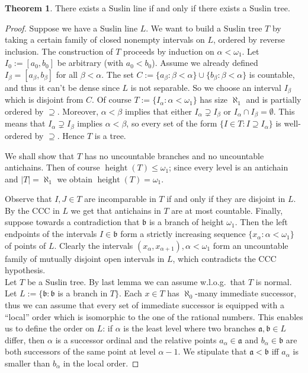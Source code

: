 \documentclass[12pt,a4paper]{report}
\theoremstyle{definition}
\newtheorem{theorem}{Theorem}[chapter] %
\theoremstyle{num.custom-title}
\DeclareMathOperator{\height}{height}
\begin{document}
\begin{theorem}
There exists a Suslin line if and only if there exists a Suslin tree.
\begin{proof}
Suppose we have a Suslin line $L$. We want to build a Suslin tree $T$ by taking a certain family of closed nonempty intervals on $L$, ordered by reverse inclusion. The construction of $T$ proceeds by induction on $\alpha < \omega_1$. Let $I_0 := [a_0,b_0]$ be arbitrary (with $a_0 < b_0$). Assume we already defined $I_\beta = [a_\beta,b_\beta]$ for all $\beta < \alpha$. The set $C := \{a_\beta : \beta < \alpha\} \cup \{b_\beta : \beta < \alpha\}$ is countable, and thus it can't be dense since $L$ is not separable. So we choose an interval $I_\beta$ which is disjoint from $C$. Of course $T := \{I_\alpha : \alpha < \omega_1\}$ has size $\aleph_1$ and is partially ordered by $\supseteq$. Moreover, $\alpha < \beta$ implies that either $I_\alpha \supsetneq I_\beta$ or $I_\alpha \cap I_\beta = \emptyset$. This means that $I_\alpha \supsetneq I_\beta$ implies $\alpha < \beta$, so every set of the form $\{I \in T : I \supseteq I_\alpha\}$ is well-ordered by $\supseteq$. Hence $T$ is a tree.

We shall show that $T$ has no uncountable branches and no uncountable antichains. Then of course $\height(T) \leq \omega_1$; since every level is an antichain and $|T| = \aleph_1$ we obtain $\height(T) = \omega_1$.

Observe that $I,J \in T$ are incomparable in $T$ if and only if they are disjoint in $L$. By the CCC in $L$ we get that antichains in $T$ are at most countable. Finally, suppose towards a contradiction that $\mathfrak{b}$ is a branch of height $\omega_1$. Then the left endpoints of the intervals $I \in \mathfrak{b}$ form a strictly increasing sequence $\{x_\alpha : \alpha < \omega_1\}$ of points of $L$. Clearly the intervals $(x_\alpha, x_{\alpha+1}), \alpha < \omega_1$ form an uncountable family of mutually disjoint open intervals in $L$, which contradicts the CCC hypothesis.\\[6pt]
%
\indent Let $T$ be a Suslin tree. By last lemma we can assume w.l.o.g.\ that $T$ is normal. Let $L := \{\mathfrak{b} : \mathfrak{b}$ is a branch in $T\}$. Each $x \in T$ has $\aleph_0$-many immediate successor, thus we can assume that every set of immediate successor is equipped with a ``local'' order which is isomorphic to the one of the rational numbers. This enables us to define the order on $L$: if $\alpha$ is the least level where two branches $\mathfrak{a}, \mathfrak{b} \in L$ differ, then $\alpha$ is a successor ordinal and the relative points $a_\alpha \in \mathfrak{a}$ and $b_\alpha \in \mathfrak{b}$ are both successors of the same point at level $\alpha-1$. We stipulate that $\mathfrak{a} < \mathfrak{b}$ iff $a_\alpha$ is smaller than $b_\alpha$ in the local order.


\end{proof}
\end{theorem}
\end{document}
